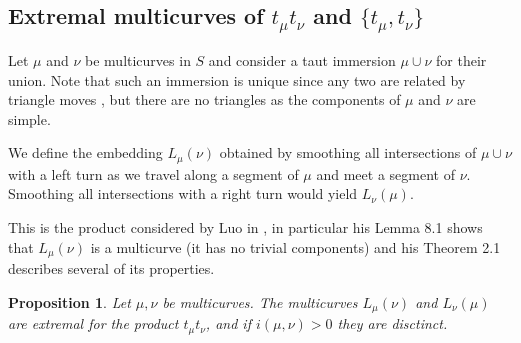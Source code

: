 \documentclass{amsart}
\newtheorem{proposition}{Proposition}
\newtheorem{corollary}{Corollary}
\newcommand{\ML}{\mathrm{ML}}
\begin{document}

\subsection{Extremal multicurves of $t_\mu t_\nu$ and $\{t_\mu, t_\nu\}$}

Let $\mu$ and $\nu$ be multicurves in $S$ and consider a taut immersion $\mu \cup \nu$ for their union. Note that such an immersion is unique since any two are related by triangle moves \cite{Hass_shortening_1994}, but there are no triangles as the components of $\mu$ and $\nu$ are simple.

We define the embedding $L_\mu(\nu)$ obtained by smoothing all intersections of $\mu \cup \nu$ with a left turn as we travel along a segment of $\mu$ and meet a segment of $\nu$. Smoothing all intersections with a right turn would yield $L_\nu(\mu)$.

This is the product considered by Luo in \cite{Luo_simple_2010}, in particular his {Lemma 8.1} shows that $L_\mu(\nu)$ is a multicurve (it has no trivial components) and his {Theorem 2.1} describes several of its properties.

\begin{proposition} \label{Luo-smoothings-extremal}
Let $\mu,\nu$ be multicurves. The multicurves $L_\mu(\nu)$ and $L_\nu(\mu)$ are extremal for the product $t_\mu t_\nu$, and if $i(\mu,\nu)>0$ they are disctinct.
\end{proposition}
\end{document}
